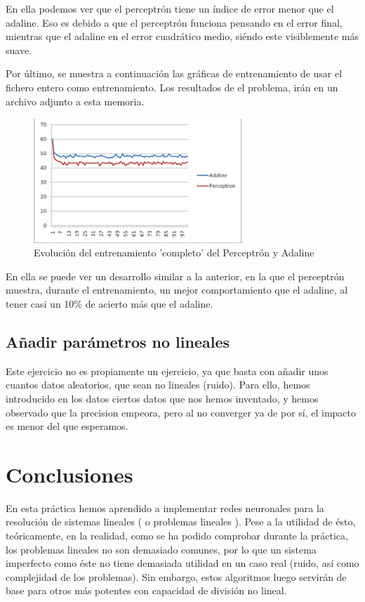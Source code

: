 \documentclass[12pt]{article}
\begin{document}
En ella podemos ver que el perceptrón tiene un índice de error menor que el adaline. Eso es debido a que el perceptrón funciona pensando en el error final, mientras que el adaline en el error cuadrático medio, siéndo este visiblemente más suave.

Por último, se muestra a continuación las gráficas de entrenamiento de usar el fichero entero como entrenamiento. Los resultados de el problema, irán en un archivo adjunto a esta memoria.
\begin{figure}[h!]
    \label{fig:fig7}
  \centering
       \includegraphics[width=0.7\textwidth]{recursos/fig7}
    \caption{Evolución del entrenamiento 'completo' del Perceptrón y Adaline}
\end{figure} 

En ella se puede ver un desarrollo similar a la anterior, en la que el perceptrón muestra, durante el entrenamiento, un mejor comportamiento que el adaline, al tener casi un 10\% de acierto más que el adaline.


\subsection{Añadir parámetros no lineales}
Este ejercicio no es propiamente un ejercicio, ya que basta con añadir unos cuantos datos aleatorios, que sean no lineales (ruido). Para ello, hemos introducido en los datos ciertos datos que nos hemos inventado, y hemos observado que la precision empeora, pero al no converger ya de por sí, el impacto es menor del que esperamos.

\newpage
\section*{Conclusiones}

En esta práctica hemos aprendido a implementar redes neuronales para la resolución de sistemas lineales ( o problemas lineales ). Pese a la utilidad de ésto, teóricamente, en la realidad, como se ha podido comprobar durante la práctica, los problemas lineales no son demasiado comunes, por lo que un sistema imperfecto como éste no tiene demasiada utilidad en un caso real (ruido, así como complejidad de los problemas). Sin embargo, estos algoritmos luego servirán de base para otros más potentes con capacidad de división no lineal.
\end{document}
